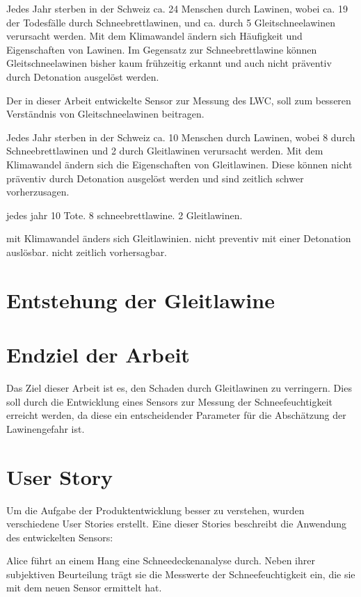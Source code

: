 Jedes Jahr sterben in der Schweiz ca. 24 Menschen durch Lawinen, wobei ca. 19 der Todesfälle durch Schneebrettlawinen, und ca. durch 5 Gleitschneelawinen verursacht werden. Mit dem Klimawandel ändern sich Häufigkeit und Eigenschaften von Lawinen. Im Gegensatz zur Schneebrettlawine können Gleitschneelawinen bisher kaum frühzeitig erkannt und auch nicht präventiv durch Detonation ausgelöst werden. \cite{WSLSLF.2024}


Der in dieser Arbeit entwickelte Sensor zur Messung des LWC, soll zum besseren Verständnis von Gleitschneelawinen beitragen.


\iffalse
Jedes Jahr sterben in der Schweiz ca. 10 Menschen durch Lawinen, wobei 8 durch Schneebrettlawinen und 2 durch Gleitlawinen verursacht werden. Mit dem Klimawandel ändern sich die Eigenschaften von Gleitlawinen. Diese können nicht präventiv durch Detonation ausgelöst werden und sind zeitlich schwer vorherzusagen.


jedes jahr 10 Tote. 8 schneebrettlawine. 2 Gleitlawinen.

mit Klimawandel änders sich Gleitlawinien. nicht preventiv mit einer Detonation auslösbar. nicht zeitlich vorhersagbar.


\section{Entstehung der Gleitlawine}



\section{Endziel der Arbeit}

Das Ziel dieser Arbeit ist es, den Schaden durch Gleitlawinen zu verringern. Dies soll durch die Entwicklung eines Sensors zur Messung der Schneefeuchtigkeit erreicht werden, da diese ein entscheidender Parameter für die Abschätzung der Lawinengefahr ist.

\section{User Story}

Um die Aufgabe der Produktentwicklung besser zu verstehen, wurden verschiedene User Stories erstellt. Eine dieser Stories beschreibt die Anwendung des entwickelten Sensors:

Alice führt an einem Hang eine Schneedeckenanalyse durch. Neben ihrer subjektiven Beurteilung trägt sie die Messwerte der Schneefeuchtigkeit ein, die sie mit dem neuen Sensor ermittelt hat.

